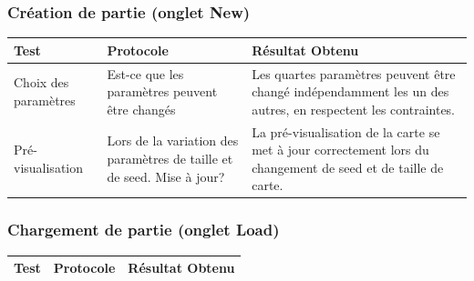 \documentclass[a4paper,10pt,openany,oneside]{report}
\begin{document}
\subsubsection{Création de partie (onglet New)}
\begin{center}
	\begin{tabular}{| p{3cm} | p{6cm} | p{6cm} |}
	\hline
		 \textbf{Test} & \textbf{Protocole} & \textbf{Résultat Obtenu}
		 \\ \hline
		Choix des paramètres & Est-ce que les paramètres peuvent être changés & Les quartes paramètres peuvent être changé indépendamment les un des autres, en respectent les contraintes.
		\\ \hline
		Pré-visualisation & Lors de la variation des paramètres de taille et de seed. Mise à jour? & La pré-visualisation de la carte se met à jour correctement lors du changement de seed et de taille de carte.
		\\ \hline
	\hline
	\end{tabular}
\end{center}

\subsubsection{Chargement de partie (onglet Load)}
\begin{center}
	\begin{tabular}{| p{3cm} | p{6cm} | p{6cm} |}
	\hline
		 \textbf{Test} & \textbf{Protocole} & \textbf{Résultat Obtenu}
		 \\ \hline
		\hline
	\end{tabular}
\end{center}
\end{document}
